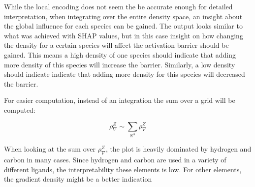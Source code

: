 While the local encoding does not seem the be accurate enough for detailed interpretation,
when integrating over the entire density space, an insight about the global influence for each species can be gained.
The output looks similar to what was achieved with SHAP values, but in this case insight on how changing the density for a certain species will affect the activation barrier should be gained.
This means a high density of one species should indicate that adding more density of this species will increase the barrier.
Similarly, a low density should indicate indicate that adding more density for this species will decreased the barrier. %

For easier computation, instead of an integration the sum over a grid will be computed: 

$$ \rho_\nabla^Z \sim \sum_{\mathbb{R}^3} \rho_\nabla^Z $$

When looking at the sum over $\rho^Z_\nabla$, the plot is heavily dominated by hydrogen and carbon
in many cases.
Since hydrogen and carbon are used in a variety of different ligands, the interpretability
these elements is low.
For other elements, the gradient density might be a better indication 


